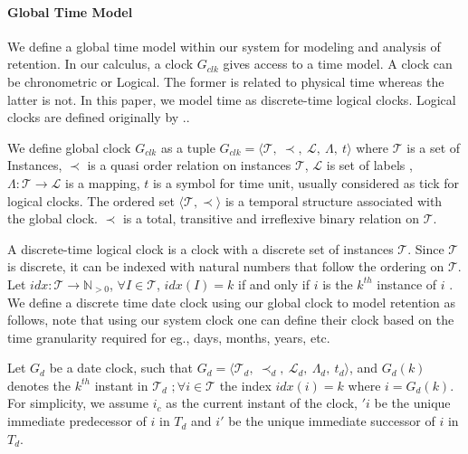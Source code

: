  \paragraph{Global Time Model } 
We define a global time model within our system for modeling and analysis of retention. In our calculus, a  clock $ G_{clk}$ gives access to a time model. A clock can be chronometric or Logical. The former is related to physical time whereas the latter is not. In this paper, we model time as discrete-time logical clocks. Logical clocks are defined originally by .. 
\begin{definition} \label{def:clk}
We define global clock $ G_{clk}$ as a tuple $ G_{clk} =  \langle \mathcal{T},\  \prec, \ \mathcal{L}, \ \Lambda,\  t  \rangle $ where $ \mathcal{T}$ is a set of Instances, $ \prec$ is a quasi order relation on instances $ \mathcal{T}$, $\mathcal{L} $ is set of labels , $ \Lambda : \mathcal{T} \rightarrow \mathcal{L} $ is a mapping, $ t$ is a symbol
  for time unit, usually considered as tick for logical clocks. The ordered set $ \langle \mathcal{T} , \prec \rangle $ is a temporal structure associated with the global clock. $ \prec$ is a total, transitive and irreflexive binary relation on $ \mathcal{T}$. 
\end{definition}
A discrete-time logical clock is a  clock with a discrete set of instances $ \mathcal{T}$. Since $ \mathcal{T}$ is discrete, it can be indexed with natural numbers that follow the ordering on $ \mathcal{T}.$ Let  $ idx : \mathcal{T} \to \mathbb{N}_{>0}$, $ \forall I \in \mathcal{T}$, $ idx(I) = k $ if and only if $ i$ is the $ k^{th}$ instance of $ i$ . 
We define a discrete time date clock using our global clock to model retention as follows, note that using our system clock one can define their clock based on the time granularity required for eg., days, months, years, etc. 
\begin{definition} \label{def:Dclk}
Let $ G_{d} $ be a date clock, such that  $ G_{d} =  \langle \mathcal{T}_{{d}},\  \prec_{{d}}, \ \mathcal{L}_{{d}}, \ \Lambda_{{d}},\  t_{{d}}  \rangle $, and $ G_{d}(k)$ denotes the $ k^{th}$ instant in  $ \mathcal{T}_{{d}}$ $ ; \forall i \in \mathcal{T}$ the index $ idx(i)= k $ where $ i = G_{d}(k)$. For simplicity, we assume $i_{c}$ as the current instant of the clock, $ 'i$ be the unique immediate predecessor of $ i$ in $ {T}_{{d}}$ and $ i'$ be the unique immediate successor of $ i$ in $ {T}_{{d}}$.
 \end{definition}
